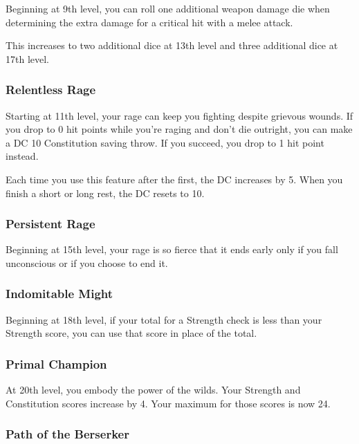 \documentclass[
]{article}
\begin{document}
Beginning at 9th level, you can roll one additional weapon damage die
when determining the extra damage for a critical hit with a melee
attack.

This increases to two additional dice at 13th level and three additional
dice at 17th level.

\hypertarget{relentless-rage}{%
\subsubsection{Relentless Rage}\label{relentless-rage}}

Starting at 11th level, your rage can keep you fighting despite grievous
wounds. If you drop to 0 hit points while you're raging and don't die
outright, you can make a DC 10 Constitution saving throw. If you
succeed, you drop to 1 hit point instead.

Each time you use this feature after the first, the DC increases by 5.
When you finish a short or long rest, the DC resets to 10.

\hypertarget{persistent-rage}{%
\subsubsection{Persistent Rage}\label{persistent-rage}}

Beginning at 15th level, your rage is so fierce that it ends early only
if you fall unconscious or if you choose to end it.

\hypertarget{indomitable-might}{%
\subsubsection{Indomitable Might}\label{indomitable-might}}

Beginning at 18th level, if your total for a Strength check is less than
your Strength score, you can use that score in place of the total.

\hypertarget{primal-champion}{%
\subsubsection{Primal Champion}\label{primal-champion}}

At 20th level, you embody the power of the wilds. Your Strength and
Constitution scores increase by 4. Your maximum for those scores is now
24.

\hypertarget{path-of-the-berserker}{%
\subsubsection{Path of the Berserker}\label{path-of-the-berserker}}
\end{document}
